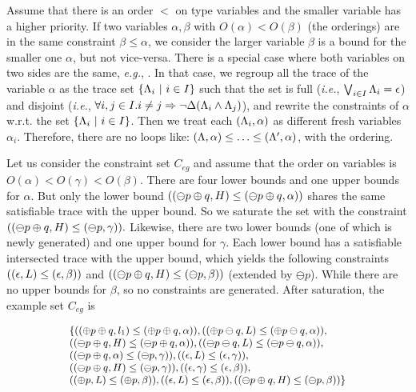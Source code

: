 {{{Assume that there is an order $<$ on type variables and the smaller variable has a higher priority.
If two variables $\alpha, \beta$ with $O(\alpha) < O (\beta)$ (the orderings) are in the same constraint $\beta \leq \alpha$, we consider the larger variable $\beta$ is a bound for the smaller one $\alpha$, but not vice-versa.
There is a special case where both variables on two sides are the same, \emph{e.g.},  .
In that case, we regroup all the trace of the variable $\alpha$ as the trace set $\{\Lambda_i~|~i \in I\}$ such that the set is full (\emph{i.e.}, $\bigvee_{i\in I}\Lambda_i  = \epsilon$) and disjoint (\emph{i.e.}, $\forall i,j\in I. i\neq j \Rightarrow \neg\Delta(\Lambda_i\land\Lambda_j)$), and rewrite the constraints of $\alpha$ w.r.t. the set $\{\Lambda_i~|~i \in I\}$.  Then we treat each $(\Lambda_i, \alpha)$ as different fresh variables $\alpha_i$.
Therefore, there are no loops like: $(\Lambda,\alpha) \leq \ldots\leq (\Lambda',\alpha)$, with the ordering.

Let us consider the constraint set $C_{eg}$ and assume that the order on variables is $O(\alpha) < O (\gamma) < O (\beta)$. There are four lower bounds and one upper bounds for $\alpha$. But only the lower bound $((\ominus p\oplus q,H)\leq(\ominus p\oplus q,\alpha))$ shares the same satisfiable trace with the upper bound.
So we saturate the set with the constraint $((\ominus p\oplus q,H)\leq(\ominus p,\gamma)).$
Likewise, there are two lower bounds (one of which is newly generated) and one upper bound for $\gamma$. Each lower bound has a satisfiable intersected trace with the upper bound, which yields the following constraints $((\epsilon,L)\leq(\epsilon,\beta))$ and $((\ominus p\oplus q,H)\leq(\ominus p,\beta))$ (extended by $\ominus p$).
While there are no upper bounds for $\beta$, so no constraints are generated.
After saturation, the example set $C_{eg}$ is

\[
{\small
\begin{array}{l}
\{((\oplus p\oplus q,l_1)\leq(\oplus p\oplus q,\alpha)), ((\oplus p\ominus q,L)\leq(\oplus p\ominus q,\alpha)), \\
((\ominus p\oplus q,H)\leq(\ominus p\oplus q,\alpha)),
((\ominus p\ominus q,L)\leq(\ominus p\ominus q,\alpha)),\\
((\ominus p\oplus q,\alpha)\leq(\ominus p,\gamma)),
((\epsilon,L)\leq(\epsilon,\gamma)),\\
((\ominus p\oplus q,H)\leq(\ominus p,\gamma)),
((\epsilon,\gamma)\leq(\epsilon,\beta)), \\
((\oplus p,L)\leq(\oplus p,\beta)),
((\epsilon,L)\leq(\epsilon,\beta)),
((\ominus p\oplus q,H)\leq(\ominus p,\beta))
\}
\end{array}
}
\]

}}}
